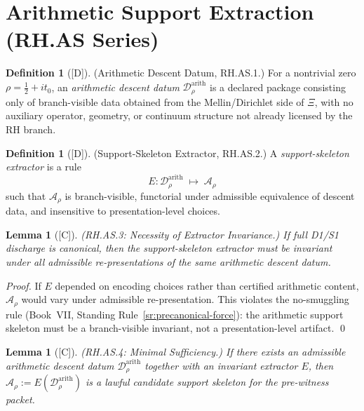 \documentclass[12pt,oneside]{amsbook}
\theoremstyle{plain}
\newtheorem{lemma}[theorem]{Lemma}
\theoremstyle{definition}
\newtheorem{definition}[theorem]{Definition}
\theoremstyle{remark}
\newcommand{\status}[1]{\textup{[#1]}}
\begin{document}
\section{Arithmetic Support Extraction (RH.AS Series)}
\label{sec:rh-as}

\begin{definition}[\status{D}]\label{def:rh-arith-descent-datum}
\textup{(Arithmetic Descent Datum, RH.AS.1.)}
For a nontrivial zero $\rho = \tfrac{1}{2}+it_0$, an
\emph{arithmetic descent datum} $\mathcal{D}_\rho^{\mathrm{arith}}$
is a declared package consisting only of branch-visible data
obtained from the Mellin/Dirichlet side of $\Xi$, with no
auxiliary operator, geometry, or continuum structure not already
licensed by the RH branch.
\end{definition}

\begin{definition}[\status{D}]\label{def:rh-support-extractor}
\textup{(Support-Skeleton Extractor, RH.AS.2.)}
A \emph{support-skeleton extractor} is a rule
\[
 E:\mathcal{D}_\rho^{\mathrm{arith}} \;\mapsto\; \mathcal{A}_\rho
\]
such that $\mathcal{A}_\rho$ is branch-visible, functorial under
admissible equivalence of descent data, and insensitive to
presentation-level choices.
\end{definition}

\begin{lemma}[\status{C}]\label{lem:rh-as3}
\textup{(RH.AS.3: Necessity of Extractor Invariance.)}
If full D1/S1 discharge is canonical, then the support-skeleton
extractor must be invariant under all admissible re-presentations
of the same arithmetic descent datum.
\end{lemma}

\begin{proof}
If $E$ depended on encoding choices rather than certified arithmetic
content, $\mathcal{A}_\rho$ would vary under admissible
re-presentation. This violates the no-smuggling rule
(Book~VII, Standing Rule~\ref{sr:precanonical-force}): the
arithmetic support skeleton must be a branch-visible invariant,
not a presentation-level artifact. \qed
\end{proof}

\begin{lemma}[\status{C}]\label{lem:rh-as4}
\textup{(RH.AS.4: Minimal Sufficiency.)}
If there exists an admissible arithmetic descent datum
$\mathcal{D}_\rho^{\mathrm{arith}}$ together with an invariant
extractor $E$, then $\mathcal{A}_\rho := E(\mathcal{D}_\rho^{\mathrm{arith}})$
is a lawful candidate support skeleton for the pre-witness packet.
\end{lemma}
\end{document}
